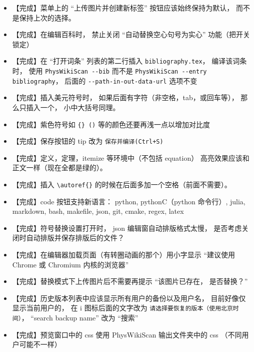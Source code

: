 \begin{itemize}
\item 【完成】菜单上的 “上传图片并创建新标签” 按钮应该始终保持为默认， 而不是保持上次的选择。

\item 【完成】在编辑百科时， 禁止关闭 “自动替换空心句号为实心” 功能（把开关锁定）

\item 【完成】在 “打开词条” 列表的第二行插入 \verb|bibliography.tex|， 编译该词条时， 使用 \verb|PhysWikiScan --bib| 而不是 \verb|PhysWikiScan --entry bibliography|， 后面的 \verb|--path-in-out-data-url| 选项不变

\item 【完成】插入美元符号时， 如果后面有字符（非空格，tab，或回车等）， 那么只插入一个， 小中大括号同理。

\item 【完成】紫色符号如 \verb|{} ()|  等的颜色还要再浅一点以增加对比度

\item 【完成】保存按钮的 tip 改为 \verb|保存并编译(Ctrl+S)|

\item 【完成】定义，定理，itemize 等环境中（不包括 equation） 高亮效果应该和正文一样（现在全都是绿的）。

\item 【完成】插入 \verb|\autoref{}| 的时候在后面多加一个空格（前面不需要）。

\item 【完成】code 按钮支持新语言： python, pythonC（python 命令行）, julia, markdown, bash, makefile, json, git, cmake, regex, latex

\item 【完成】符号替换设置打开时， json 编辑窗自动排版格式太慢， 是否考虑关闭时自动排版并保存排版后的文件？

\item 【完成】在编辑器加载页面（有转圈动画的那个）用小字显示 “建议使用 Chrome 或 Chromium 内核的浏览器”

\item 【完成】替换模式下上传图片后不需要再提示 “该图片已存在， 是否替换？”

\item 【完成】历史版本列表中应该显示所有用户的备份以及用户名， 目前好像仅显示当前用户的， 在 i 图标后面的文字改为 \verb|请选择要恢复的版本（使用北京时间）|， “search backup name”  改为 “搜索”

\item 【完成】预览窗口中的 css 使用 PhysWikiScan 输出文件夹中的 css （不同用户可能不一样）


\end{itemize}
